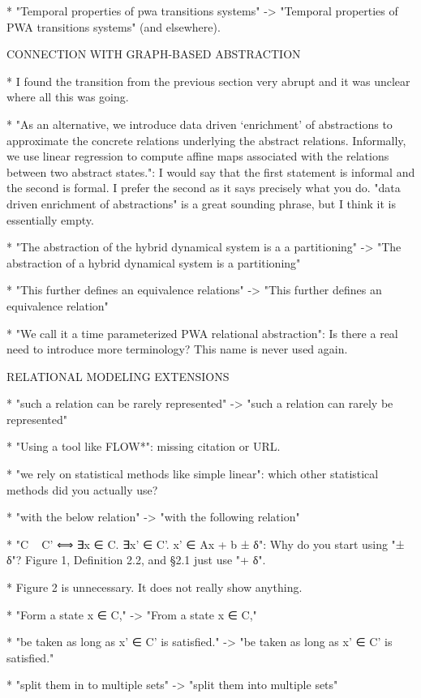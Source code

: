 * "Temporal properties of pwa transitions systems"
  -> "Temporal properties of PWA transitions systems" (and elsewhere).

CONNECTION WITH GRAPH-BASED ABSTRACTION

* I found the transition from the previous section very abrupt and it was
  unclear where all this was going.

* "As an alternative, we introduce data driven ‘enrichment’ of abstractions
  to approximate the concrete relations underlying the abstract relations.
  Informally, we use linear regression to compute affine maps associated
  with the relations between two abstract states.": I would say that the
  first statement is informal and the second is formal. I prefer the second
  as it says precisely what you do. "data driven enrichment of abstractions"
  is a great sounding phrase, but I think it is essentially empty.

* "The abstraction of the hybrid dynamical system is a a partitioning"
-> "The abstraction of a hybrid dynamical system is a partitioning"

* "This further defines an equivalence relations"
-> "This further defines an equivalence relation"

* "We call it a time parameterized PWA relational abstraction": Is there
  a real need to introduce more terminology? This name is never used again.

RELATIONAL MODELING EXTENSIONS

* "such a relation can be rarely represented"
-> "such a relation can rarely be represented"

* "Using a tool like FLOW*": missing citation or URL.

* "we rely on statistical methods like simple linear": which other
  statistical methods did you actually use?

* "with the below relation"
-> "with the following relation"

* "C ~ C' ⟺  ∃x ∈ C. ∃x' ∈ C'. x' ∈ Ax + b ± δ": Why do you start
using "±
  δ"? Figure 1, Definition 2.2, and §2.1 just use "+ δ".

* Figure 2 is unnecessary. It does not really show anything.

* "Form a state x ∈ C,"
-> "From a state x ∈ C,"

* "be taken as long as x' ∈ C’ is satisfied."
-> "be taken as long as x' ∈ C' is satisfied."

* "split them in to multiple sets"
-> "split them into multiple sets"

